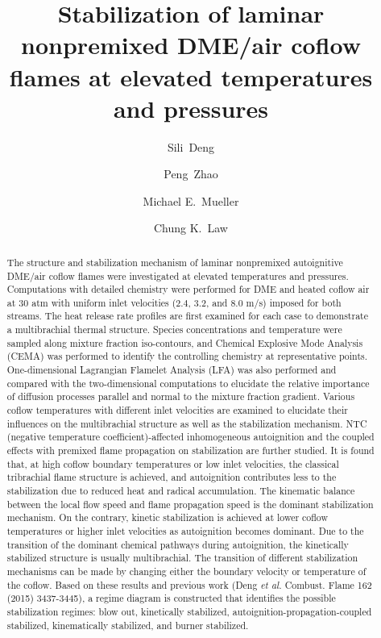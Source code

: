 \documentclass[review,3p,times]{elsarticle}
\begin{document}
\begin{frontmatter}

\title{Stabilization of laminar nonpremixed DME/air coflow flames at elevated temperatures and pressures}

\author{Sili~Deng}
\author{Peng~Zhao}
\author{Michael E.~Mueller}
\author{Chung K.~Law}

\address{Department of Mechanical and Aerospace Engineering, Princeton University, Princeton, NJ 08544, USA}

\begin{abstract}

The structure and stabilization mechanism of laminar nonpremixed autoignitive DME/air coflow flames were investigated at elevated temperatures and pressures. Computations with detailed chemistry were performed for DME and heated coflow air at $30$ atm with uniform inlet velocities ($2.4$, $3.2$, and $8.0$ m/s) imposed for both streams.  The heat release rate profiles are first examined for each case to demonstrate a multibrachial thermal structure.  Species concentrations and temperature were sampled along mixture fraction iso-contours, and Chemical Explosive Mode Analysis (CEMA) was performed to identify the controlling chemistry at representative points.  One-dimensional Lagrangian Flamelet Analysis (LFA) was also performed and compared with the two-dimensional computations to elucidate the relative importance of diffusion processes parallel and normal to the mixture fraction gradient.  Various coflow temperatures with different inlet velocities are examined to elucidate their influences on the multibrachial structure as well as the stabilization mechanism.  NTC (negative temperature coefficient)-affected inhomogeneous autoignition and the coupled effects with premixed flame propagation on stabilization are further studied.  It is found that, at high coflow boundary temperatures or low inlet velocities, the classical tribrachial flame structure is achieved, and autoignition contributes less to the stabilization due to reduced heat and radical accumulation.  The kinematic balance between the local flow speed and flame propagation speed is the dominant stabilization mechanism.  On the contrary, kinetic stabilization is achieved at lower coflow temperatures or higher inlet velocities as autoignition becomes dominant.  Due to the transition of the dominant chemical pathways during autoignition, the kinetically stabilized structure is usually multibrachial.  The transition of different stabilization mechanisms can be made by changing either the boundary velocity or temperature of the coflow.  Based on these results and previous work (Deng \emph{et al.} Combust. Flame 162 (2015) 3437-3445), a regime diagram is constructed that identifies the possible stabilization regimes: blow out, kinetically stabilized, autoignition-propagation-coupled stabilized, kinematically stabilized, and burner stabilized.          


\end{abstract}
\end{frontmatter}
\end{document}
